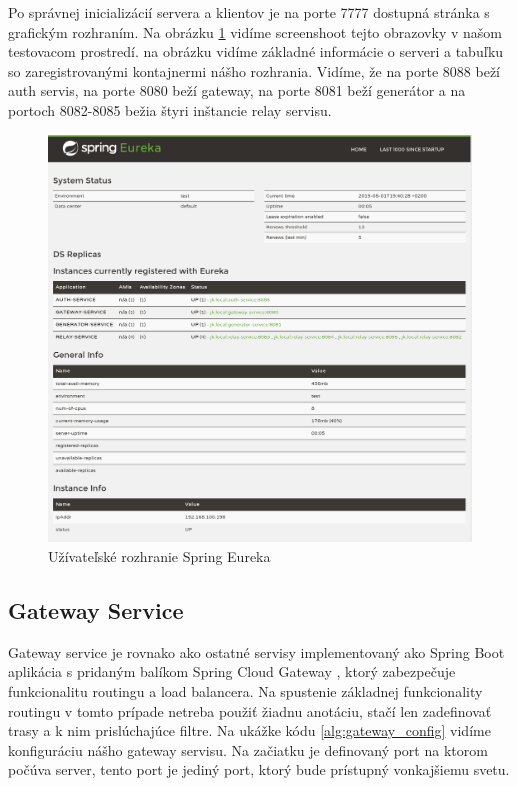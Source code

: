 Po správnej inicializácií servera a klientov je na porte 7777 dostupná stránka s grafickým rozhraním. Na obrázku \ref{eureka_gui} vidíme screenshoot tejto obrazovky v našom testovacom prostredí. na obrázku vidíme základné informácie o serveri a tabuľku so zaregistrovanými kontajnermi nášho rozhrania. Vidíme, že na porte 8088 beží auth servis, na porte 8080 beží gateway, na porte 8081 beží generátor a na portoch 8082-8085 bežia štyri inštancie relay servisu. 

\begin{figure}[!htbp] 
	\centering 
	\includegraphics[width=16cm]{img/eureka_gui.png} 
	\caption{Užívateľské rozhranie Spring Eureka} 
	\label{eureka_gui} 
\end{figure}


\subsection{Gateway Service}  
Gateway service je rovnako ako ostatné servisy implementovaný ako Spring Boot aplikácia s pridaným balíkom Spring Cloud Gateway \cite{cloud_gateway}, ktorý zabezpečuje funkcionalitu routingu a load balancera.  
Na spustenie základnej funkcionality routingu v tomto prípade netreba použiť žiadnu anotáciu, stačí len zadefinovať trasy a k nim prislúchajúce filtre. Na ukážke kódu \ref{alg:gateway_config} vidíme konfiguráciu nášho gateway servisu. Na začiatku je definovaný port na ktorom počúva server, tento port je jediný port, ktorý bude prístupný vonkajšiemu svetu. 



